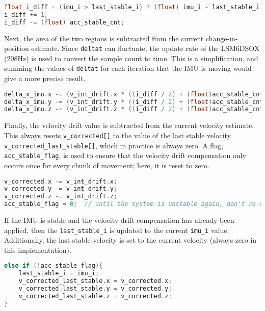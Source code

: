 \documentclass[12pt,a4paper]{report}
\begin{document}
\begin{lstlisting}[language=C++]
float i_diff = (imu_i > last_stable_i) ? (float) imu_i - last_stable_i : (float) 10000 - last_stable_i + imu_i;
i_diff += 1;
i_diff -= (float) acc_stable_cnt;
\end{lstlisting}

Next, the area of the two regions is subtracted from the current change-in-position estimate. Since \verb|deltat| can fluctuate,  the update rate of the LSM6DSOX (208Hz) is used to convert the sample count to time. This is a simplification, and summing the values of \verb|deltat| for each iteration that the IMU is moving would give a more precise result.

\begin{lstlisting}[language=C++]
delta_x_imu.x -= (v_int_drift.x * ((i_diff / 2) + (float)acc_stable_cnt) / sampleFreq);
delta_x_imu.y -= (v_int_drift.y * ((i_diff / 2) + (float)acc_stable_cnt) / sampleFreq);
delta_x_imu.z -= (v_int_drift.z * ((i_diff / 2) + (float)acc_stable_cnt) / sampleFreq);
\end{lstlisting}

Finally, the velocity drift value is subtracted from the current velocity estimate. This always resets \verb|v_corrected[]| to the value of the last stable velocity \verb|v_corrected_last_stable[]|, which in practice is always zero. A flag, \verb|acc_stable_flag|, is used to ensure that the velocity drift compensation only occurs once for every chunk of movement; here, it is reset to zero.

\begin{lstlisting}[language=C++]
v_corrected.x -= v_int_drift.x;
v_corrected.y -= v_int_drift.y;
v_corrected.z -= v_int_drift.z;
acc_stable_flag = 0;  // until the system is unstable again, don't re-account for velocity drift
\end{lstlisting}

If the IMU is stable and the velocity drift compensation has already been applied, then the \verb|last_stable_i| is updated to the current \verb|imu_i| value. Additionally, the last stable velocity is set to the current velocity (always zero in this implementation).

\begin{lstlisting}[language=C++]
else if (!acc_stable_flag){
	last_stable_i = imu_i;
	v_corrected_last_stable.x = v_corrected.x;
	v_corrected_last_stable.y = v_corrected.y;
	v_corrected_last_stable.z = v_corrected.z;
}
\end{lstlisting}
\end{document}
